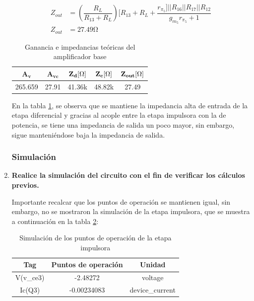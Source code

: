 \begin{enumerate}
        \begin{align*}
          Z_{out} & =\left(\dfrac{R_L}{R_{13}+R_L}\right)[R_{13}+R_L + \dfrac{r_{\pi_5}]||R_{16}||R_{17}||R_{12}}{g_{m_5}r_{\pi_5}+1} \\[0.2cm]
          Z_{out} & = 27.49 \si{\ohm}
        \end{align*}

        \begin{table}[H]
          \centering
          \begin{tabular}{|c|c|c|c|c|}
            \hline
            $\mathbf{A_v}$ & $\mathbf{A_{vc}}$ & $\mathbf{Z_{d}[\ohm]}$ & $\mathbf{Z_{c}[\ohm]}$ & $\mathbf{Z_{out} [\ohm]}$ \\\hline
            265.659        & 27.91             & 41.36k                 & 48.82k                 & 27.49                     \\\hline
          \end{tabular}
          \caption{Ganancia e impedancias teóricas del amplificador base}
          \label{tab:dinamico_base}
        \end{table}

        En la tabla \ref{tab:dinamico_base}, se observa que se mantiene la impedancia alta de entrada de la etapa diferencial y gracias al acople entre la etapa impulsora con la de potencia, se tiene una impedancia de salida un poco mayor, sin embargo, sigue manteniéndose baja la impedancia de salida.

        \subsubsection{Simulación}
  \item \textbf{Realice la simulación del circuito con el fin de verificar los cálculos previos.}

        Importante recalcar que los puntos de operación se mantienen igual, sin embargo, no se mostraron la simulación de la etapa impulsora, que se muestra a continuación en la tabla \ref{tab:ptos_ope_ei}:

        \begin{table}[H]
          \centering
          \begin{tabular}{|c|c|c|}
            \hline
            \textbf{Tag} & \textbf{Puntos de operación} & \textbf{Unidad} \\
            \hline
            V(v\_ce3)    & -2.48272                     & voltage         \\\hline
            Ic(Q3)       & -0.00234083                  & device\_current \\\hline
          \end{tabular}
          \caption{Simulación de los puntos de operación de la etapa impulsora}
          \label{tab:ptos_ope_ei}
        \end{table}
        \begin{itemize}




\end{itemize}
\end{enumerate}
